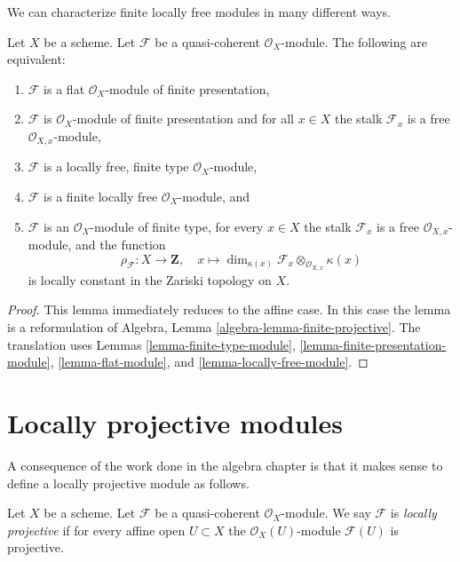 \noindent
We can characterize finite locally free modules in many different ways.

\begin{lemma}
\label{lemma-finite-locally-free}
Let $X$ be a scheme.
Let $\mathcal{F}$ be a quasi-coherent $\mathcal{O}_X$-module.
The following are equivalent:
\begin{enumerate}
\item $\mathcal{F}$ is a flat $\mathcal{O}_X$-module of finite presentation,
\item $\mathcal{F}$ is $\mathcal{O}_X$-module of finite presentation and
for all $x \in X$ the stalk $\mathcal{F}_x$ is a free
$\mathcal{O}_{X, x}$-module,
\item $\mathcal{F}$ is a locally free, finite type $\mathcal{O}_X$-module,
\item $\mathcal{F}$ is a finite locally free $\mathcal{O}_X$-module, and
\item $\mathcal{F}$ is an $\mathcal{O}_X$-module of finite type,
for every $x \in X$ the stalk $\mathcal{F}_x$ is a free
$\mathcal{O}_{X, x}$-module, and the function
$$
\rho_\mathcal{F} : X \to \mathbf{Z}, \quad
x \longmapsto
\dim_{\kappa(x)} \mathcal{F}_x \otimes_{\mathcal{O}_{X, x}} \kappa(x)
$$
is locally constant in the Zariski topology on $X$.
\end{enumerate}
\end{lemma}

\begin{proof}
This lemma immediately reduces to the affine case.
In this case the lemma is a reformulation of
Algebra, Lemma \ref{algebra-lemma-finite-projective}.
The translation uses
Lemmas \ref{lemma-finite-type-module},
\ref{lemma-finite-presentation-module},
\ref{lemma-flat-module}, and
\ref{lemma-locally-free-module}.
\end{proof}






\section{Locally projective modules}
\label{section-locally-projective}

\noindent
A consequence of the work done in the algebra chapter is that it
makes sense to define a locally projective module as follows.

\begin{definition}
\label{definition-locally-projective}
Let $X$ be a scheme. Let $\mathcal{F}$ be a quasi-coherent
$\mathcal{O}_X$-module. We say $\mathcal{F}$ is {\it locally projective}
if for every affine open $U \subset X$ the $\mathcal{O}_X(U)$-module
$\mathcal{F}(U)$ is projective.
\end{definition}

